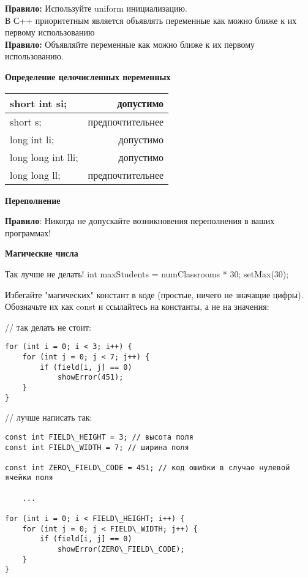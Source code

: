 \documentclass[a4paper,16pt]{report} %
\begin{document}
\textbf{Правило:} Используйте uniform инициализацию.
\\
В С++ приоритетным является объявлять переменные как можно ближе к их первому использованию
\\
\textbf{Правило:} Объявляйте переменные как можно ближе к их первому использованию.
\\
\begin{center}
	\textbf{Определение целочисленных переменных}
\end{center}
\begin{center}
	\begin{tabular}{ | l | r |}
		\hline
		short int si; & допустимо \\ \hline
		short s; & предпочтительнее \\ \hline
		long int li; & допустимо \\ \hline
		long long int lli; & допустимо \\ \hline
		long long ll; & предпочтительнее \\
		\hline
	\end{tabular}
\end{center}
\begin{center}
	\large\textbf{Переполнение}
\end{center}
\begin{sloppypar}
\textbf{Правило}: Никогда не допускайте возникновения переполнения в ваших программах!
\end{sloppypar}

\begin{center}
	\large\textbf{Магические числа}
\end{center}
Так лучше не делать!
int maxStudents = numClassrooms * 30;
setMax(30);
\\
\begin{sloppypar}
	Избегайте "магических" констант в коде (простые, ничего не значащие цифры). Обозначьте их как const и ссылайтесь на константы, а не на значения:
\end{sloppypar}
// так делать не стоит:
\begin{verbatim}
for (int i = 0; i < 3; i++) {
    for (int j = 0; j < 7; j++) {
        if (field[i, j] == 0)
            showError(451);
    }
}
\end{verbatim}
// лучше написать так:
\\
\begin{verbatim}
const int FIELD\_HEIGHT = 3; // высота поля
const int FIELD\_WIDTH = 7; // ширина поля

const int ZERO\_FIELD\_CODE = 451; // код ошибки в случае нулевой ячейки поля

    ...

for (int i = 0; i < FIELD\_HEIGHT; i++) {
    for (int j = 0; j < FIELD\_WIDTH; j++) {
        if (field[i, j] == 0)
            showError(ZERO\_FIELD\_CODE);
    }
}
\end{verbatim}
\end{document}

